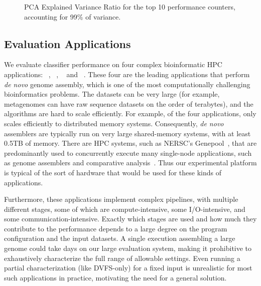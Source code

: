 \begin{figure}[t]
  \begin{centering}
    
    \caption{PCA Explained Variance Ratio for the top 10 performance counters, accounting for 99\% of variance.}
    \label{fig:pca-evr}
  \end{centering}
\end{figure}


\subsection{Evaluation Applications}
\label{sec:setup-evaluation}

We evaluate classifier performance on four complex bioinformatic HPC applications: ~\cite{georganas2015hipmer}, ~\cite{peng2012idba}, ~\cite{li2015megahit} and ~\cite{nurk2016metaspades}.
These four are the leading applications that perform \emph{de novo} genome assembly, which is one of the most computationally challenging bioinformatics problems.
The datasets can be very large (for example, metagenomes can have raw sequence datasets on the order of terabytes), and the algorithms are hard to scale efficiently.
For example, of the four applications, only  scales efficiently to distributed memory systems.
Consequently, \emph{de novo} assemblers are typically run on very large shared-memory systems, with at least 0.5TB of memory.
There are HPC systems, such as NERSC's Genepool~\cite{genepool}, that are predominantly used to concurrently execute many single-node applications, such as genome assemblers and comparative analysis~\cite{dosanjh2013extreme}.
Thus our experimental platform is typical of the sort of hardware that would be used for these kinds of applications.

Furthermore, these applications implement complex pipelines, with multiple different stages, some of which are compute-intensive, some I/O-intensive, and some communication-intensive.
Exactly which stages are used and how much they contribute to the performance depends to a large degree on the program configuration and the input datasets.
A single execution assembling a large genome could take days on our large evaluation system, making it prohibitive to exhaustively characterize the full range of allowable settings.
Even running a partial characterization (like DVFS-only) for a fixed input is unrealistic for most such applications in practice, motivating the need for a general solution.

